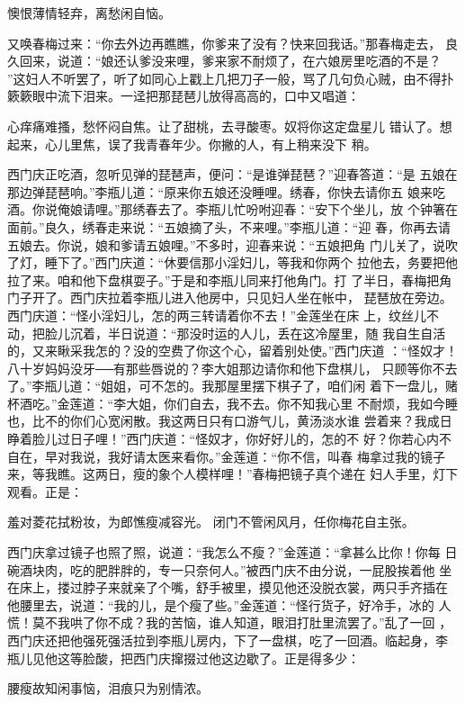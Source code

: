 懊恨薄情轻弃，离愁闲自恼。

又唤春梅过来：“你去外边再瞧瞧，你爹来了没有？快来回我话。”那春梅走去，
良久回来，说道：“娘还认爹没来哩，爹来家不耐烦了，在六娘房里吃酒的不是？
”这妇人不听罢了，听了如同心上戳上几把刀子一般，骂了几句负心贼，由不得扑
簌簌眼中流下泪来。一迳把那琵琶儿放得高高的，口中又唱道：

心痒痛难搔，愁怀闷自焦。让了甜桃，去寻酸枣。奴将你这定盘星儿
错认了。想起来，心儿里焦，误了我青春年少。你撇的人，有上稍来没下
稍。

西门庆正吃酒，忽听见弹的琵琶声，便问：“是谁弹琵琶？”迎春答道：“是
五娘在那边弹琵琶响。”李瓶儿道：“原来你五娘还没睡哩。绣春，你快去请你五
娘来吃酒。你说俺娘请哩。”那绣春去了。李瓶儿忙吩咐迎春：“安下个坐儿，放
个钟箸在面前。”良久，绣春走来说：“五娘摘了头，不来哩。”李瓶儿道：“迎
春，你再去请五娘去。你说，娘和爹请五娘哩。”不多时，迎春来说：“五娘把角
门儿关了，说吹了灯，睡下了。”西门庆道：“休要信那小淫妇儿，等我和你两个
拉他去，务要把他拉了来。咱和他下盘棋耍子。”于是和李瓶儿同来打他角门。打
了半日，春梅把角门子开了。西门庆拉着李瓶儿进入他房中，只见妇人坐在帐中，
琵琶放在旁边。西门庆道：“怪小淫妇儿，怎的两三转请着你不去！”金莲坐在床
上，纹丝儿不动，把脸儿沉着，半日说道：“那没时运的人儿，丢在这冷屋里，随
我自生自活的，又来瞅采我怎的？没的空费了你这个心，留着别处使。”西门庆道
：“怪奴才！八十岁妈妈没牙──有那些唇说的？李大姐那边请你和他下盘棋儿，
只顾等你不去了。”李瓶儿道：“姐姐，可不怎的。我那屋里摆下棋子了，咱们闲
着下一盘儿，赌杯酒吃。”金莲道：“李大姐，你们自去，我不去。你不知我心里
不耐烦，我如今睡也，比不的你们心宽闲散。我这两日只有口游气儿，黄汤淡水谁
尝着来？我成日睁着脸儿过日子哩！”西门庆道：“怪奴才，你好好儿的，怎的不
好？你若心内不自在，早对我说，我好请太医来看你。”金莲道：“你不信，叫春
梅拿过我的镜子来，等我瞧。这两日，瘦的象个人模样哩！”春梅把镜子真个递在
妇人手里，灯下观看。正是：

羞对菱花拭粉妆，为郎憔瘦减容光。
闭门不管闲风月，任你梅花自主张。

西门庆拿过镜子也照了照，说道：“我怎么不瘦？”金莲道：“拿甚么比你！你每
日碗酒块肉，吃的肥胖胖的，专一只奈何人。”被西门庆不由分说，一屁股挨着他
坐在床上，搂过脖子来就亲了个嘴，舒手被里，摸见他还没脱衣裳，两只手齐插在
他腰里去，说道：“我的儿，是个瘦了些。”金莲道：“怪行货子，好冷手，冰的
人慌！莫不我哄了你不成？我的苦恼，谁人知道，眼泪打肚里流罢了。”乱了一回
，西门庆还把他强死强活拉到李瓶儿房内，下了一盘棋，吃了一回酒。临起身，李
瓶儿见他这等脸酸，把西门庆撺掇过他这边歇了。正是得多少：

腰瘦故知闲事恼，泪痕只为别情浓。